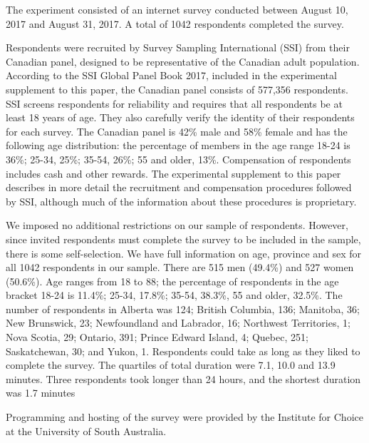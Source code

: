 \documentclass[11pt,letter]{article}
\begin{document}
The experiment consisted of an internet survey conducted between August 10, 2017 and August 31, 2017.
A total of 1042 respondents completed the survey.

Respondents were recruited by Survey Sampling International (SSI) from their Canadian panel, designed to be representative of the Canadian adult population.
According to the SSI Global Panel Book 2017, included in the experimental supplement to this paper, the Canadian panel consists of 577,356 respondents.
SSI screens respondents for reliability and requires that all respondents be at least 18 years of age.
They also carefully verify the identity of their respondents for each survey.
The Canadian panel is 42\% male and 58\% female and has the following age distribution: the percentage of members in the age range 18-24 is 36\%; 25-34, 25\%; 35-54, 26\%; 55 and older, 13\%.
Compensation of respondents includes cash and other rewards.
The experimental supplement to this paper describes in more detail the recruitment and compensation procedures followed by SSI, although much of the information about these procedures is proprietary.

We imposed no additional restrictions on our sample of respondents.
However, since invited respondents must complete the survey to be included in the sample, there is some self-selection.
We have full information on age, province and sex for all 1042 respondents in our sample.
There are 515 men (49.4\%) and 527 women (50.6\%).
Age ranges from 18 to 88; the percentage of respondents in the age bracket 18-24 is 11.4\%; 25-34, 17.8\%; 35-54, 38.3\%, 55 and older, 32.5\%.
The number of respondents in Alberta was 124; British Columbia, 136; Manitoba, 36; New Brunswick, 23; Newfoundland and Labrador, 16; Northwest Territories, 1; Nova Scotia, 29; Ontario, 391; Prince Edward Island, 4; Quebec, 251; Saskatchewan, 30; and Yukon, 1.
Respondents could take as long as they liked to complete the survey.
The quartiles of total duration were 7.1, 10.0 and 13.9 minutes.
Three respondents took longer than 24 hours, and the shortest duration was 1.7 minutes

Programming and hosting of the survey were provided by the Institute for Choice at the University of South Australia.
\end{document}
